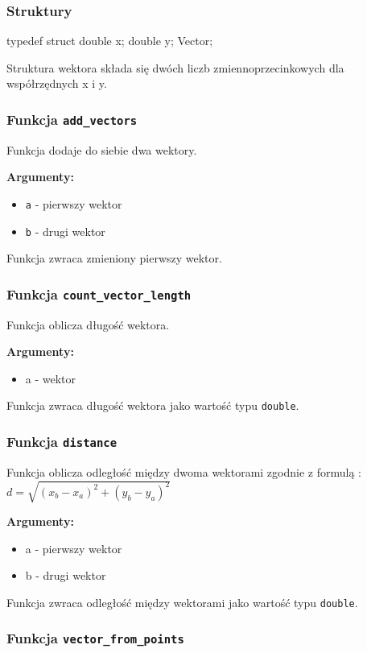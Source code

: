 \documentclass[]{article}
\begin{document}
\subsubsection{Struktury}
\begin{mylisting}
typedef struct {
    double x;
    double y;
} Vector;
\end{mylisting}
Struktura wektora składa się dwóch liczb zmiennoprzecinkowych dla współrzędnych x i y.
\subsubsection{Funkcja \texttt{add\_vectors}}

Funkcja dodaje do siebie dwa wektory.

\textbf{Argumenty:}
\begin{itemize}
    \item \texttt{a} - pierwszy wektor
    \item \texttt{b} - drugi wektor
\end{itemize}
Funkcja zwraca zmieniony pierwszy wektor.

\subsubsection{Funkcja \texttt{count\_vector\_length}}

Funkcja oblicza długość wektora.

\textbf{Argumenty:}
\begin{itemize}
    \item a - wektor
\end{itemize}
Funkcja zwraca długość wektora jako wartość typu \texttt{double}.

\subsubsection{Funkcja \texttt{distance}}

Funkcja oblicza odległość między dwoma wektorami zgodnie z formulą :$d = \sqrt{(x_b - x_a)^2 + (y_b - y_a)^2}$

\textbf{Argumenty:}
\begin{itemize}
    \item a - pierwszy wektor
    \item b - drugi wektor
\end{itemize}
Funkcja zwraca odległość między wektorami jako wartość typu \texttt{double}.

\subsubsection{Funkcja \texttt{vector\_from\_points}}
\end{document}
